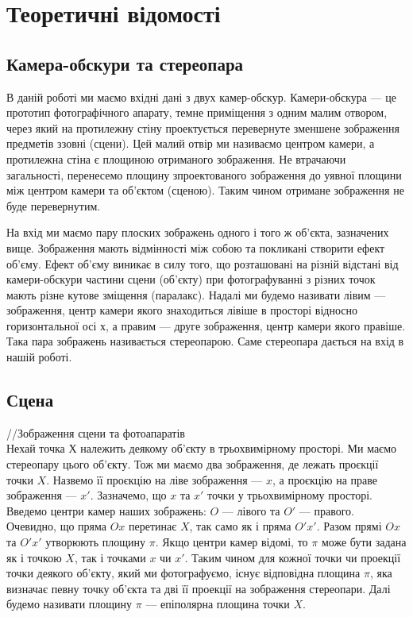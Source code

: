 \chapter{Теоретичні відомості}


\section{Камера-обскури та стереопара}
В даній роботі ми маємо вхідні дані з двух камер-обскур. Камери-обскура --- 
це прототип фотографічного апарату, темне приміщення з одним малим отвором, 
через який на протилежну стіну проектується перевернуте зменшене зображення 
предметів ззовні (сцени). Цей малий отвір ми називаємо центром камери, а протилежна 
стіна є площиною отриманого зображення. Не втрачаючи загальності, перенесемо 
площину зпроектованого зображення до уявної площини між центром камери та 
об'єктом (сценою). Таким чином отримане зображення не буде 
перевернутим.  

На вхід ми маємо пару плоских зображень одного і того ж об'єкта, зазначених вище.
Зображення мають відмінності між собою та покликані створити ефект об'єму. Ефект 
об'єму виникає в силу того, що розташовані на різній відстані від камери-обскури 
частини сцени (об'єкту) при фотографуванні з різних точок мають різне кутове 
зміщення (паралакс). Надалі ми будемо називати лівим --- зображення, центр камери
якого знаходиться лівіше в просторі відносно горизонтальної осі $х$, а правим ---
друге зображення, центр камери якого правіше. 
Така пара зображень називається стереопарою. Саме стереопара дається на вхід в 
нашій роботі.


\section{Сцена}
//Зображення сцени та фотоапаратів\\
Нехай точка $Х$ належить деякому об'єкту в трьохвимірному просторі. Ми маємо 
стереопару цього об'єкту. Тож ми маємо два зображення, де лежать проєкції точки 
$X$. Назвемо її проєкцію на ліве зображення --- $x$, а проєкцію на праве 
зображення --- $x'$. Зазначемо, що $x$ та $x'$ точки у трьохвимірному просторі. 
Введемо центри камер наших зображень: $O$ --- лівого та $O'$ --- правого. 
Очевидно, що пряма $Ox$ перетинає $X$, так само як і пряма $O'x'$. Разом прямі 
$Ox$ та $O'x'$ утворюють площину $\pi$. Якщо центри камер відомі, то $\pi$ може 
бути задана як і точкою $X$, так і точками $x$ чи $x'$. Таким чином для кожної
точки чи проекції точки деякого об'єкту, який ми фотографуємо, існує відповідна 
площина $\pi$, яка визначає певну точку об'єкта та дві її проекції на зображення 
стереопари. Далі будемо називати площину $\pi$ --- епіполярна площина точки $X$.



